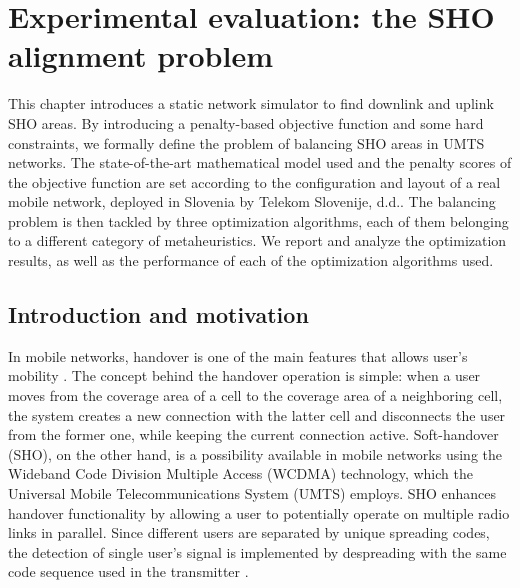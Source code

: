 
\chapter{Experimental evaluation: the SHO alignment problem \label{chap:Experimental-evaluation-the-SHO-alignment-problem}}


\noindent This chapter introduces a static network simulator to find
downlink and uplink SHO areas. By introducing a penalty-based objective
function and some hard constraints, we formally define the problem
of balancing SHO areas in UMTS networks. The state-of-the-art mathematical
model used and the penalty scores of the objective function are set
according to the configuration and layout of a real mobile network,
deployed in Slovenia by Telekom Slovenije, d.d.. The balancing problem
is then tackled by three optimization algorithms, each of them belonging
to a different category of metaheuristics. We report and analyze the
optimization results, as well as the performance of each of the optimization
algorithms used.


\section{Introduction and motivation \label{sec:Introduction}}

In mobile networks, handover is one of the main features that allows
user's mobility \cite{WCDMAforUMTS_RadioAccessForThirdGenerationMobileCommunications}.
The concept behind the handover operation is simple: when a user moves
from the coverage area of a cell to the coverage area of a neighboring
cell, the system creates a new connection with the latter cell and
disconnects the user from the former one, while keeping the current
connection active. Soft-handover (SHO), on the other hand, is a possibility
available in mobile networks using the Wideband Code Division Multiple
Access (WCDMA) technology, which the Universal Mobile Telecommunications
System (UMTS) employs. SHO enhances handover functionality by allowing
a user to potentially operate on multiple radio links in parallel.
Since different users are separated by unique spreading codes, the
detection of single user's signal is implemented by despreading with
the same code sequence used in the transmitter \cite{WCDMAforUMTS_RadioAccessForThirdGenerationMobileCommunications}.

